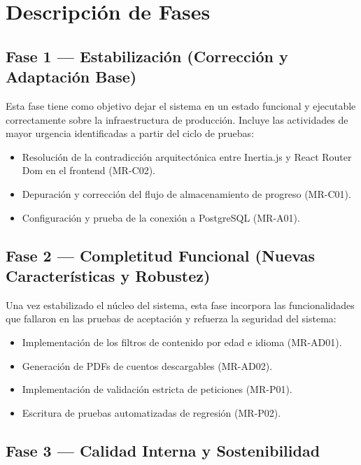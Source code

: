 \section{Descripción de Fases}

\subsection{Fase 1 --- Estabilización (Corrección y Adaptación Base)}

Esta fase tiene como objetivo dejar el sistema en un estado funcional y ejecutable
correctamente sobre la infraestructura de producción. Incluye las actividades de
mayor urgencia identificadas a partir del ciclo de pruebas:

\begin{itemize}
    \item Resolución de la contradicción arquitectónica entre Inertia.js y React Router
          Dom en el frontend (MR-C02).
    \item Depuración y corrección del flujo de almacenamiento de progreso (MR-C01).
    \item Configuración y prueba de la conexión a PostgreSQL (MR-A01).
\end{itemize}

\subsection{Fase 2 --- Completitud Funcional (Nuevas Características y Robustez)}

Una vez estabilizado el núcleo del sistema, esta fase incorpora las funcionalidades
que fallaron en las pruebas de aceptación y refuerza la seguridad del sistema:

\begin{itemize}
    \item Implementación de los filtros de contenido por edad e idioma (MR-AD01).
    \item Generación de PDFs de cuentos descargables (MR-AD02).
    \item Implementación de validación estricta de peticiones (MR-P01).
    \item Escritura de pruebas automatizadas de regresión (MR-P02).
\end{itemize}

\subsection{Fase 3 --- Calidad Interna y Sostenibilidad}


